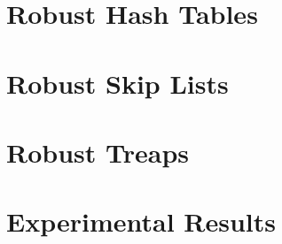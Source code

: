 \section{Robust Hash Tables}\label{sec:ht}


\section{Robust Skip Lists}\label{sec:skiplist}


\section{Robust Treaps}\label{sec:treaps}


\section{Experimental Results}\label{sec:experimental}

